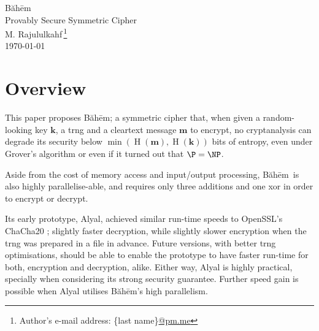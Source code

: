\documentclass[twocolumn,hidelinks]{article}
\newcommand{\baheem}{Băhēm}
\DeclareMathOperator{\entropy}{H}
\begin{document}
\begin{center}
    \Huge
    \baheem\\
    \Large
    Provably Secure Symmetric Cipher\\
    \normalsize
    \vspace{0.5em}
    M. Rajululkahf\,\footnote{Author's e-mail address: \{last
    name\}\url{@pm.me}}\\
    \vspace{0.5em}
    \footnotesize
    \today\\
\end{center}

\section*{Overview}
This paper proposes \baheem;  a symmetric cipher that, when given a
random-looking key $\mathbf{k}$, a \gls{trng} and a cleartext message
$\mathbf{m}$ to encrypt, no cryptanalysis can degrade its security below
$\min(\entropy(\mathbf{m}), \entropy(\mathbf{k}))$ bits of entropy, even
under Grover's algorithm \cite{10.1145/237814.237866} or even if it turned
out that $\P = \NP$.

Aside from the cost of memory access and input/output processing, \baheem\
is also highly parallelise-able, and requires only three additions and one
\gls{xor} in order to encrypt or decrypt.

Its early prototype, Alyal, achieved similar run-time speeds to OpenSSL's
ChaCha20 \cite{chacha20}; slightly faster decryption, while slightly slower
encryption when the \gls{trng} was prepared in a file in advance.  Future
versions, with better \gls{trng} optimisations, should be able to enable
the prototype to have faster run-time for both, encryption and decryption,
alike.  Either way, Alyal is highly practical, specially when considering
its strong security guarantee.  Further speed gain is possible when Alyal
utilises \baheem's high parallelism.
\end{document}
